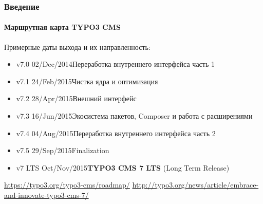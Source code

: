 \begin{frame}[fragile]
	\frametitle{Введение}
	\framesubtitle{Маршрутная карта TYPO3 CMS}

	Примерные даты выхода и их направленность:

	\begin{itemize}
		\item v7.0 \tabto{1.1cm}02/Dec/2014\tabto{3.4cm}Переработка внутреннего интерфейса часть 1
		\item v7.1 \tabto{1.1cm}24/Feb/2015\tabto{3.4cm}Чистка ядра и оптимизация
		\item v7.2 \tabto{1.1cm}28/Apr/2015\tabto{3.4cm}Внешний интерфейс
		\item v7.3 \tabto{1.1cm}16/Jun/2015\tabto{3.4cm}Экосистема пакетов, Composer\newline
			\tabto{3.4cm}и работа с расширениями
		\item v7.4 \tabto{1.1cm}04/Aug/2015\tabto{3.4cm}Переработка внутреннего интерфейса часть 2

		\item
			\begingroup
				\color{typo3orange}
					v7.5 \tabto{1.1cm}29/Sep/2015\tabto{3.4cm}Finalization
			\endgroup

		\item v7 LTS \tabto{1.1cm}Oct/Nov/2015\tabto{3.4cm}\textbf{TYPO3 CMS 7 LTS} (Long Term Release)
	\end{itemize}

	\smaller
		\url{https://typo3.org/typo3-cms/roadmap/}\newline
		\url{http://typo3.org/news/article/embrace-and-innovate-typo3-cms-7/}
	\normalsize

\end{frame}

